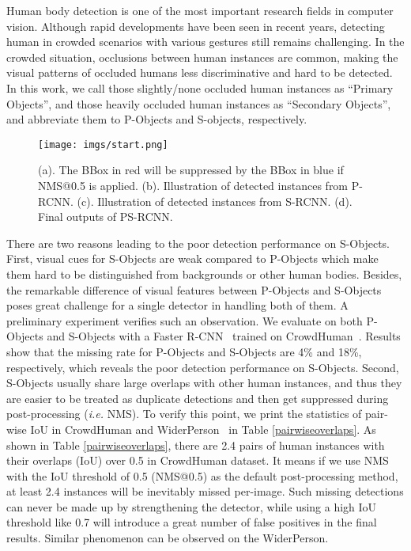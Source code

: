 \documentclass{article}
\begin{document}
Human body detection is one of the most important research fields in computer vision. Although rapid developments have been seen in recent years, detecting human in crowded scenarios with various gestures still remains challenging. In the crowded situation, occlusions between human instances are common, making the visual patterns of occluded humans less discriminative and hard to be detected. In this work, we call those slightly/none occluded human instances as ``Primary Objects'', and those heavily occluded human instances as ``Secondary Objects'', and abbreviate them to P-Objects and S-objects, respectively. 

\begin{figure}[!t]
\begin{center}
\texttt{[image: imgs/start.png]}
\end{center}
\caption{(a). The BBox in red will be suppressed by the BBox in blue if NMS@0.5 is applied. (b). Illustration of detected instances from P-RCNN. (c). Illustration of detected instances from S-RCNN. (d). Final outputs of PS-RCNN.}
   \label{fstart}
\end{figure}

There are two reasons leading to the poor detection performance on S-Objects. First, visual cues for S-Objects are weak compared to P-Objects which make them hard to be distinguished from backgrounds or other human bodies. Besides, the remarkable difference of visual features between P-Objects and S-Objects poses great challenge for a single detector in handling both of them. A preliminary experiment verifies such an observation. We evaluate on both P-Objects and S-Objects with a Faster R-CNN~\cite{Ren2017Faster} trained on CrowdHuman~\cite{CrowdHuman}. Results show that the missing rate for P-Objects and S-Objects are 4\% and 18\%, respectively, which reveals the poor detection performance on S-Objects. Second, S-Objects usually share large overlaps with other human instances, and thus they are easier to be treated as duplicate detections and then get suppressed during post-processing (\emph{i.e.} NMS). To verify this point, we print the statistics of pair-wise IoU in CrowdHuman and WiderPerson~\cite{Zhang2019WiderPerson} in Table \ref{pairwiseoverlaps}. As shown in Table \ref{pairwiseoverlaps}, there are 2.4 pairs of human instances with their overlaps (IoU) over 0.5 in CrowdHuman dataset. It means if we use NMS with the IoU threshold of 0.5 (NMS@0.5) as the default post-processing method, at least 2.4 instances will be inevitably missed per-image. Such missing detections can never be made up by strengthening the detector, while using a high IoU threshold like 0.7 will introduce a great number of false positives in the final results. Similar phenomenon can be observed on the WiderPerson.
\end{document}
